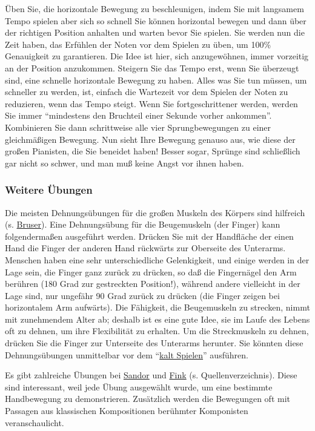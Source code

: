 Üben Sie, die horizontale Bewegung zu beschleunigen, indem Sie mit langsamem Tempo spielen aber sich so schnell Sie können horizontal bewegen und dann über der richtigen Position anhalten und warten bevor Sie spielen.
Sie werden nun die Zeit haben, das Erfühlen der Noten vor dem Spielen zu üben, um 100\% Genauigkeit zu garantieren.
Die Idee ist hier, sich anzugewöhnen, immer vorzeitig an der Position anzukommen.
Steigern Sie das Tempo erst, wenn Sie überzeugt sind, eine schnelle horizontale Bewegung zu haben.
Alles was Sie tun müssen, um schneller zu werden, ist, einfach die Wartezeit vor dem Spielen der Noten zu reduzieren, wenn das Tempo steigt.
Wenn Sie fortgeschrittener werden, werden Sie immer \enquote{mindestens den Bruchteil einer Sekunde vorher ankommen}.
Kombinieren Sie dann schrittweise alle vier Sprungbewegungen zu einer gleichmäßigen Bewegung.
Nun sieht Ihre Bewegung genauso aus, wie diese der großen Pianisten, die Sie beneidet haben!
Besser sogar, Sprünge sind schließlich gar nicht so schwer, und man muß keine Angst vor ihnen haben.
 

\subsubsection{Weitere Übungen}
\label{c1iii7g}

Die meisten Dehnungsübungen für die großen Muskeln des Körpers sind hilfreich (s. \hyperref[Bruser]{Bruser}).
Eine Dehnungsübung für die Beugemuskeln (der Finger) kann folgendermaßen ausgeführt werden.
Drücken Sie mit der Handfläche der einen Hand die Finger der anderen Hand rückwärts zur Oberseite des Unterarms.
Menschen haben eine sehr unterschiedliche Gelenkigkeit, und einige werden in der Lage sein, die Finger ganz zurück zu drücken, so daß die Fingernägel den Arm berühren (180 Grad zur gestreckten Position!), während andere vielleicht in der Lage sind, nur ungefähr 90 Grad zurück zu drücken (die Finger zeigen bei horizontalem Arm aufwärts).
Die Fähigkeit, die Beugemuskeln zu strecken, nimmt mit zunehmendem Alter ab; deshalb ist es eine gute Idee, sie im Laufe des Lebens oft zu dehnen, um ihre Flexibilität zu erhalten.
Um die Streckmuskeln zu dehnen, drücken Sie die Finger zur Unterseite des Unterarms herunter.
Sie könnten diese Dehnungsübungen unmittelbar vor dem \enquote{\hyperref[c1iii6g]{kalt Spielen}} ausführen.

Es gibt zahlreiche Übungen bei \hyperref[Sandor]{Sandor} und \hyperref[Fink]{Fink} (s. Quellenverzeichnis).
Diese sind interessant, weil jede Übung ausgewählt wurde, um eine bestimmte Handbewegung zu demonstrieren.
Zusätzlich werden die Bewegungen oft mit Passagen aus klassischen Kompositionen berühmter Komponisten veranschaulicht.



